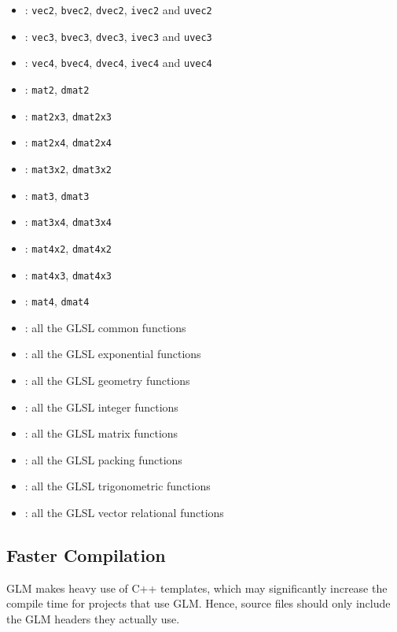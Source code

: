 \documentclass{scrartcl}
\numberwithin{figure}{subsection}
\begin{document}
\begin{itemize}
  \item {}: \verb|vec2|, \verb|bvec2|, \verb|dvec2|, \verb|ivec2| and \verb|uvec2|
  \item {}: \verb|vec3|, \verb|bvec3|, \verb|dvec3|, \verb|ivec3| and \verb|uvec3|
  \item {}: \verb|vec4|, \verb|bvec4|, \verb|dvec4|, \verb|ivec4| and \verb|uvec4|
  \item {}: \verb|mat2|, \verb|dmat2|
  \item {}: \verb|mat2x3|, \verb|dmat2x3|
  \item {}: \verb|mat2x4|, \verb|dmat2x4|
  \item {}: \verb|mat3x2|, \verb|dmat3x2|
  \item {}: \verb|mat3|, \verb|dmat3|
  \item {}: \verb|mat3x4|, \verb|dmat3x4|
  \item {}: \verb|mat4x2|, \verb|dmat4x2|
  \item {}: \verb|mat4x3|, \verb|dmat4x3|
  \item {}: \verb|mat4|, \verb|dmat4|
  \item {}: all the GLSL common functions
  \item {}: all the GLSL exponential functions
  \item {}: all the GLSL geometry functions
  \item {}: all the GLSL integer functions
  \item {}: all the GLSL matrix functions
  \item {}: all the GLSL packing functions
  \item {}: all the GLSL trigonometric functions
  \item {}: all the GLSL vector relational functions
\end{itemize}

\subsection{Faster Compilation}
GLM makes heavy use of C++ templates, which may significantly increase the compile time for projects that use GLM.  Hence, source files should only include the GLM headers they actually use.
\end{document}
